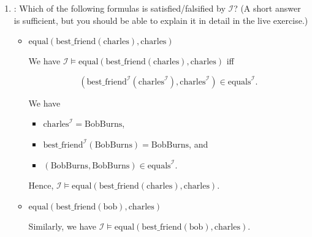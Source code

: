 \documentclass[solution]{acAssignment}
\begin{document}
\vspace{0.4cm}
\begin{enumerate}
    \item {}:
        Which of the following formulas is satisfied/falsified by $\mathcal{I}$?
        (A short answer is sufficient, but you should be able to explain it in detail in the live exercise.)
        
        \begin{itemize}
            \item $\mathrm{equal}(\mathrm{best\_friend}(\mathrm{charles}), \mathrm{charles})$
            
                \begin{acSolution}
                    We have $\mathcal{I} \models \mathrm{equal}(\mathrm{best\_friend}(\mathrm{charles}), \mathrm{charles})$ iff
                    
                    \begin{equation}
                        (\mathrm{best\_friend}^\mathcal{I}(\mathrm{charles}^\mathcal{I}), \mathrm{charles}^\mathcal{I}) \in \mathrm{equals}^\mathcal{I}.
                    \end{equation}
                    
                    We have
                    
                    \begin{itemize}
                        \item $\mathrm{charles}^\mathcal{I} = \mathrm{BobBurns}$,
                        \item $\mathrm{best\_friend}^\mathcal{I}(\mathrm{BobBurns}) = \mathrm{BobBurns}$, and
                        \item $(\mathrm{BobBurns}, \mathrm{BobBurns}) \in \mathrm{equals}^\mathcal{I}$.
                    \end{itemize}
                    
                    Hence, $\mathcal{I} \models \mathrm{equal}(\mathrm{best\_friend}(\mathrm{charles}), \mathrm{charles})$.
                \end{acSolution}
            \item $\mathrm{equal}(\mathrm{best\_friend}(\mathrm{bob}), \mathrm{charles})$
            
                \begin{acSolution}
                    Similarly, we have $\mathcal{I} \models \mathrm{equal}(\mathrm{best\_friend}(\mathrm{bob}), \mathrm{charles})$.
                \end{acSolution}
            

\end{itemize}
\end{enumerate}
\end{document}

